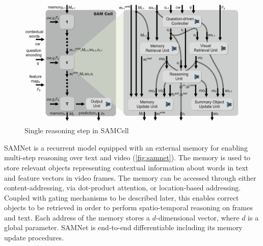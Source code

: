 \begin{figure}[!b]
	\centering
	\includegraphics[width=\textwidth]{../img/architecture/samcell_reasoning}
	\caption{Single reasoning step in SAMCell}
	\label{fig:samneta}
\end{figure}	




SAMNet is a recurrent model equipped with an external memory for enabling multi-step reasoning over text and video (\cref{fig:samnet}).
The memory is used to store relevant objects representing contextual information about words in text and feature vectors in video frames. The memory 
can be accessed through either content-addressing, via dot-product attention, or location-based addressing. 
Coupled with gating mechanisms to be described later, this enables correct objects to be retrieved 
in order to perform spatio-temporal reasoning on frames and text. Each address of the memory stores
a $d$-dimensional vector, where $d$ is a global parameter.
SAMNet is end-to-end differentiable including its memory update procedures. 


